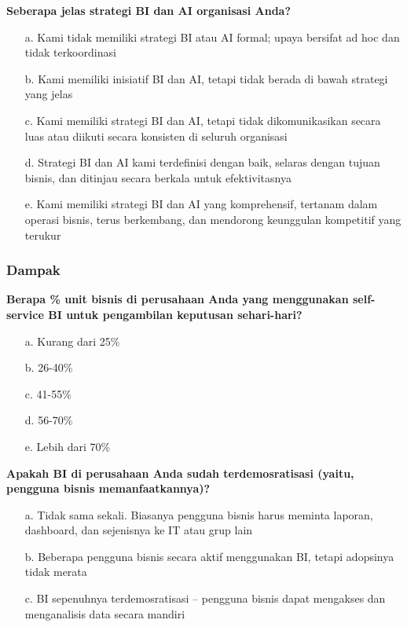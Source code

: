 \documentclass{article}
\begin{document}
\textbf{Seberapa jelas strategi BI dan AI organisasi Anda?}

\begin{enumerate}
	\item[a.] Kami tidak memiliki strategi BI atau AI formal; upaya bersifat ad hoc dan tidak terkoordinasi
	\item[b.] Kami memiliki inisiatif BI dan AI, tetapi tidak berada di bawah strategi yang jelas
	\item[c.] Kami memiliki strategi BI dan AI, tetapi tidak dikomunikasikan secara luas atau diikuti secara konsisten di seluruh organisasi
	\item[d.] Strategi BI dan AI kami terdefinisi dengan baik, selaras dengan tujuan bisnis, dan ditinjau secara berkala untuk efektivitasnya
	\item[e.] Kami memiliki strategi BI dan AI yang komprehensif, tertanam dalam operasi bisnis, terus berkembang, dan mendorong keunggulan kompetitif yang terukur
\end{enumerate}

\subsubsection{Dampak}

\textbf{Berapa \% unit bisnis di perusahaan Anda yang menggunakan self-service BI untuk pengambilan keputusan sehari-hari?}

\begin{enumerate}
	\item[a.] Kurang dari 25\%
	\item[b.] 26-40\%
	\item[c.] 41-55\%
	\item[d.] 56-70\%
	\item[e.] Lebih dari 70\%
\end{enumerate}

\textbf{Apakah BI di perusahaan Anda sudah terdemosratisasi (yaitu, pengguna bisnis memanfaatkannya)?}

\begin{enumerate}
	\item[a.] Tidak sama sekali. Biasanya pengguna bisnis harus meminta laporan, dashboard, dan sejenisnya ke IT atau grup lain
	\item[b.] Beberapa pengguna bisnis secara aktif menggunakan BI, tetapi adopsinya tidak merata
	\item[c.] BI sepenuhnya terdemosratisasi – pengguna bisnis dapat mengakses dan menganalisis data secara mandiri
\end{enumerate}
\end{document}
